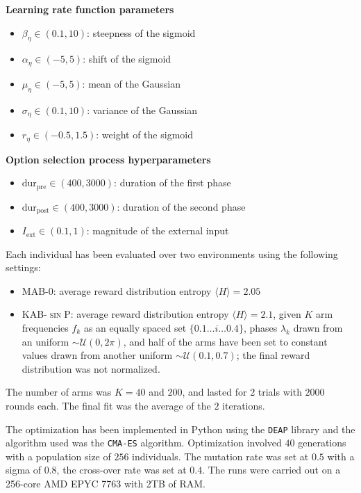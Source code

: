 \noindent \textbf{Learning rate function parameters}
\begin{itemize}
    \item $\beta_{\eta}\in (0.1, 10)$: steepness of the sigmoid
    \item $\alpha_{\eta}\in (-5, 5)$: shift of the sigmoid
    \item $\mu_{\eta}\in (-5, 5)$: mean of the Gaussian
    \item $\sigma_{\eta}\in (0.1, 10)$: variance of the Gaussian
    \item $r_{\eta}\in (-0.5, 1.5)$: weight of the sigmoid
\end{itemize}

\noindent \textbf{Option selection process hyperparameters}
\begin{itemize}
    \item $\text{dur}_{\text{pre}}\in (400, 3000)$: duration of the first phase
    \item $\text{dur}_{\text{post}}\in (400, 3000)$: duration of the second phase
    \item $I_{\text{ext}}\in (0.1, 1)$: magnitude of the external input
\end{itemize}

\noindent Each individual has been evaluated over two environments using the following settings:

\begin{itemize}
    \item \textsc{MAB-0}: average reward distribution entropy $\langle H\rangle=2.05$
    \item \textsc{KAB-$\sin$P}: average reward distribution entropy $\langle H\rangle=2.1$, given $K$ arm frequencies $f_{k}$ as an equally spaced set $\{0.1\ldots i\ldots 0.4\}$, phases $\lambda_{k}$ drawn from an uniform $\sim \mathcal{U}(0, 2\pi)$, and half of the arms have been set to constant values drawn from
        another uniform $\sim \mathcal{U}(0.1, 0.7)$; the final reward distribution was not normalized.
\end{itemize}

\noindent The number of arms was $K=40$ and $200$, and lasted for $2$ trials with $2000$ rounds each.
The final fit was the average of the $2$ iterations.

\hfill \break
The optimization has been implemented in Python using the \texttt{DEAP} library and the algorithm used was the \texttt{CMA-ES} algorithm. Optimization involved $40$ generations with a population size of $256$ individuals. The mutation rate was set at $0.5$ with a sigma of $0.8$, the cross-over rate was set at $0.4$.
The runs were carried out on a 256-core AMD EPYC 7763 with 2TB of RAM.

